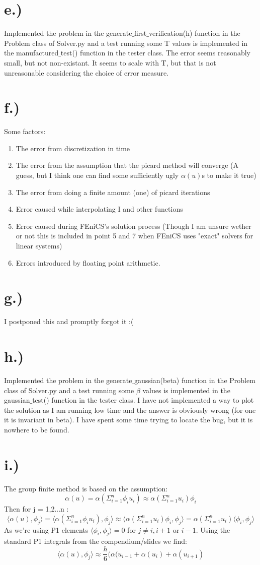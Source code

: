 \documentclass[11pt]{amsart}
\theoremstyle{definition}
\def\a{\alpha}
\def\la{\langle}
\def\ra{\rangle}
\def\p{\phi}
\begin{document}
\section{e.)}
Implemented the problem in the generate$\_$first$\_$verification(h) function in the Problem class of Solver.py and a test running some T values is implemented in the manufactured$\_$test() function in the tester class. The error seems reasonably small, but not non-existant. It seems to scale with T, but that is not unreasonable considering the choice of error measure.
\section{f.)}
Some factors:
\begin{enumerate}
\item The error from discretization in time
\item The error from the  assumption that the picard method will converge (A guess, but I think one can find some sufficiently ugly $\a(u)$s to make it true)
\item The error from doing a finite amount (one) of picard iterations
\item Error caused while interpolating I and other functions
\item Error caused during FEniCS's solution process (Though I am unsure wether or not this is included in point 5 and 7 when FEniCS uses "exact" solvers for linear systems)
\item Errors introduced by floating point arithmetic.
\end{enumerate}
\section{g.)}
I postponed this and promptly forgot it :(
\section{h.)}
Implemented the problem in the generate$\_$gaussian(beta) function in the Problem class of Solver.py and a test running some $\beta$ values is implemented in the gaussian$\_$test() function in the tester class. I have not implemented a way to plot the solution as I am running low time and the answer is obviously wrong (for one it is invariant in beta). I have spent some time trying to locate the bug, but it is nowhere to be found.
\section{i.)}
The group finite method is based on the assumption:
$$\a(u) = \a(\Sigma_{i=1}^n \p_i u_i) \approx \a(\Sigma_{i=1}^n u_i)\p_i$$
Then for j = 1,2...n :
$$\la \a(u), \p_j \ra = \la  \a(\Sigma_{i=1}^n \p_i u_i) , \p_j \ra \approx \la \a(\Sigma_{i=1}^n u_i)\p_i , \p_j \ra = \a(\Sigma_{i=1}^n u_i) \la \p_i , \p_j \ra$$
As we're using P1 elements $\la \p_i , \p_j \ra = 0$ for $j \ne i, i+1 $ or $ i-1$. Using the standard P1 integrals from the compendium/slides we find:
$$\la \a(u), \p_j \ra  \approx \frac{h}{6}(\alpha(u_{i-1} + \alpha(u_{i}) + \alpha(u_{i+1})$$
\end{document}
